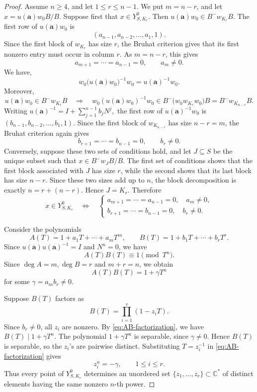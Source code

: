 \documentclass[10pt,a4paper]{amsart}
\begin{document}
\begin{proof}
Assume \(n\ge4\), and let \(1\le r\le n-1\). We put \(m=n-r\), and let $x=u(\mathbf a)w_0B/B.$
Suppose first that \(x\in Y^0_{S,K_r}\). Then
\(u(\mathbf a)w_0 \in B^-w_{K_r}B\). The first row of \(u(\mathbf a)w_0\) is
\[
(a_{n-1},a_{n-2},\ldots,a_1,1).
\]
Since the first block of \(w_{K_r}\) has size \(r\), the Bruhat
criterion gives that its first
nonzero entry must occur in column \(r\). As \(m=n-r\), this gives
\[
a_{m+1}=\cdots=a_{n-1}=0,
\qquad
a_m\neq0.
\]
We have,
\[
w_0\bigl(u(\mathbf a)w_0\bigr)^{-1}w_0
=
u(\mathbf a)^{-1}w_0.
\]
Moreover,
\[
u(\mathbf a)w_0 \in B^-w_{K_r}B
\quad\Longrightarrow\quad
w_0(u(\mathbf a)w_0)^{-1}w_0
\in
B^-\bigl(w_0w_{K_r}w_0\bigr)B
=
B^-w_{K_{n-r}}B.
\]
Writing $u(\mathbf a)^{-1}
=
I+\sum_{j=1}^{n-1}b_jN^j,$ the first row of \(u(\mathbf a)^{-1}w_0\) is $(b_{n-1},b_{n-2},\ldots,b_1,1).$
Since the first block of \(w_{K_{n-r}}\) has size \(n-r=m\), the
Bruhat criterion again  gives
\[
b_{r+1}=\cdots=b_{n-1}=0,
\qquad
b_r\neq0.
\]
Conversely, suppose these two sets of conditions hold, and let
\(J\subseteq S\) be the unique subset such that
\(x\in B^-w_JB/B\). The first set of conditions shows that the first
block associated with \(J\) has size \(r\), while the second shows
that its last block has size \(n-r\). Since these two sizes add up to
\(n\), the block decomposition is exactly \(n=r+(n-r)\). Hence
\(J=K_r\). Therefore
\begin{equation}\label{eq:maximal-stratum-toeplitz}
x\in Y^0_{S,K_r}
\quad\Longleftrightarrow\quad
\begin{cases}
a_{m+1}=\cdots=a_{n-1}=0,\quad a_m\neq0,\\
b_{r+1}=\cdots=b_{n-1}=0,\quad b_r\neq0.
\end{cases}
\end{equation}

Consider the polynomials
\[
A(T)=1+a_1T+\cdots+a_mT^m,
\qquad
B(T)=1+b_1T+\cdots+b_rT^r.
\]
Since $u(\mathbf a)u(\mathbf a)^{-1}=I$
and \(N^n=0\), we have 
\[
A(T)B(T)\equiv1\pmod{T^n}.
\]
Since $\deg A=m,\deg B=r$ and $ m+r=n$, 
we obtain
\begin{equation}\label{eq:AB-factorization}
A(T)B(T)=1+\gamma T^n
\end{equation}
for some $\gamma=a_mb_r\neq0.$

Suppose $B(T)$ factors as
\[
B(T)=\prod_{i=1}^r(1-z_iT).
\]
Since \(b_r\neq0\), all \(z_i\) are nonzero. By
\eqref{eq:AB-factorization}, we have $B(T)\mid 1+\gamma T^n.$
The polynomial \(1+\gamma T^n\) is separable, since
\(\gamma\neq0\). Hence \(B(T)\) is separable, so the \(z_i\)'s are
pairwise distinct. Substituting \(T=z_i^{-1}\) in
\eqref{eq:AB-factorization} gives
\[
z_i^n=-\gamma,
\qquad
1\le i\le r.
\]
Thus every point of \(Y^0_{S,K_r}\) determines an unordered set $\{z_1,\ldots,z_r\}
\subset\mathbb C^*$
of distinct elements having the same nonzero \(n\)-th power.


\end{proof}
\end{document}
